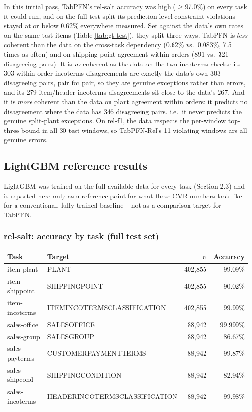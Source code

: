 \documentclass[11pt]{article}
\begin{document}
In this initial pass, TabPFN's rel-salt accuracy was high ($\geq$97.0\%) on every task it
could run, and on the full test split its prediction-level constraint violations stayed at or
below 0.62\% everywhere measured. Set against the data's own rates on the same test items
(Table \ref{tab:gt-test}), they split three ways. TabPFN is \emph{less} coherent than the data on
the cross-task dependency (0.62\% vs.\ 0.083\%, 7.5 times as often) and on shipping-point
agreement within orders (891 vs.\ 321 disagreeing pairs). It is \emph{as} coherent as the data
on the two incoterms checks: its 303 within-order incoterms disagreements are exactly the data's
own 303 disagreeing pairs, pair for pair, so they are genuine exceptions rather than errors, and
its 279 item/header incoterms disagreements sit close to the data's 267. And it is \emph{more}
coherent than the data on plant agreement within orders: it predicts no disagreement where the
data has 346 disagreeing pairs, i.e.\ it never predicts the genuine split-plant exceptions. On
rel-f1, the data respects the per-window top-three bound in all 30 test windows, so TabPFN-Rel's
11 violating windows are all genuine errors.

\subsection{LightGBM reference results}
\label{sec:lgbm-results}

LightGBM was trained on the full available data for every task (Section 2.3) and is reported
here only as a reference point for what these CVR numbers look like for a conventional,
fully-trained baseline -- not as a comparison target for TabPFN.

\subsubsection{rel-salt: accuracy by task (full test set)}
\label{sec:lgbm-accuracy}

\begin{table}[h]
\centering
\small
\begin{tabular}{@{} l l r r @{}}
\toprule
\textbf{Task} & \textbf{Target} & \textbf{$n$} & \textbf{Accuracy} \\
\midrule
item-plant & PLANT & 402{,}855 & 99.09\% \\
item-shippoint & SHIPPINGPOINT & 402{,}855 & 90.02\% \\
item-incoterms & ITEMINCOTERMSCLASSIFICATION & 402{,}855 & 99.99\% \\
sales-office & SALESOFFICE & 88{,}942 & 99.999\% \\
sales-group & SALESGROUP & 88{,}942 & 86.67\% \\
sales-payterms & CUSTOMERPAYMENTTERMS & 88{,}942 & 99.87\% \\
sales-shipcond & SHIPPINGCONDITION & 88{,}942 & 82.94\% \\
sales-incoterms & HEADERINCOTERMSCLASSIFICATION & 88{,}942 & 99.98\% \\
\bottomrule
\end{tabular}
\end{table}
\end{document}
